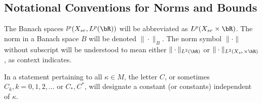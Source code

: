 
\subsection{Notational Conventions for Norms and Bounds}
The Banach spaces
$l^p(X_{sr},L^p(\bR))$ will be abbreviated as $L^p(X_{sr} \times
\bR)$. The norm in a Banach space $B$ will be denoted
$\|\cdot\|_{B}$. The norm symbol
$\|\cdot\|$ without subscript will be understood to mean either
$\|\cdot\|_{L^2(\bR)}$ or $\|\cdot\|_{L^2(X_{sr}\times
  \bR)}$, as context indicates.

In a statement pertaining to all
$\kappa \in M$, the letter $C$, or sometimes $C_k,
k=0,1,2,...$ or
$C_*,C^*$, will designate a constant (or constants) independent of
$\kappa$.

